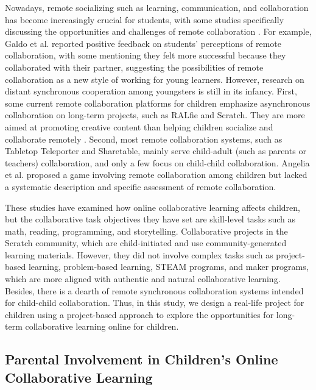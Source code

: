 Nowadays, remote socializing such as learning, communication, and collaboration has become increasingly crucial for students\citep{odenwald2020tabletop,yuan2021tabletop,galdo2022pair,gui2021teacher}, with some studies specifically discussing the opportunities and challenges of remote collaboration \citep{galdo2022pair,gui2021teacher,yuan2021tabletop}. For example, Galdo et al.\citep{galdo2022pair} reported positive feedback on students' perceptions of remote collaboration, with some mentioning they felt more successful because they collaborated with their partner, suggesting the possibilities of remote collaboration as a new style of working for young learners. However, research on distant synchronous cooperation among youngsters is still in its infancy. First, some current remote collaboration platforms for children emphasize asynchronous collaboration on long-term projects, such as RALfie\citep{orwin2015using} and Scratch\citep{aragon2009tale}. They are more aimed at promoting creative content than helping children socialize and collaborate remotely \cite{orwin2015using,aragon2009tale}. Second, most remote collaboration systems, such as Tabletop Teleporter\cite{odenwald2020tabletop} and Sharetable\citep{yarosh2013almost}, mainly serve child-adult (such as parents or teachers) collaboration, and only a few focus on child-child collaboration. Angelia et al.\citep{angelia2015design} proposed a game involving remote collaboration among children but lacked a systematic description and specific assessment of remote collaboration. 

These studies have examined how online collaborative learning affects children, but the collaborative task objectives they have set are skill-level tasks such as math, reading, programming, and storytelling. Collaborative projects in the Scratch community, which are child-initiated and use community-generated learning materials\citep{cheng2022interest,dasgupta2016remixing}. However, they did not involve complex tasks such as project-based learning, problem-based learning, STEAM programs, and maker programs, which are more aligned with authentic and natural collaborative learning. Besides, there is a dearth of remote synchronous collaboration systems intended for child-child collaboration. Thus, in this study, we design a real-life project for children using a project-based approach to explore the opportunities for long-term collaborative learning online for children.

\subsection{Parental Involvement in Children's Online Collaborative Learning}


